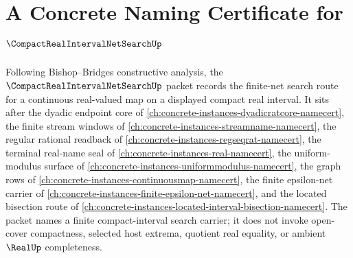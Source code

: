 \chapter{A Concrete Naming Certificate for $\CompactRealIntervalNetSearchUp$}
\label{ch:concrete-instances-compact-real-interval-net-search-namecert}

Following Bishop--Bridges constructive analysis, the $\CompactRealIntervalNetSearchUp$ packet records the finite-net search route for a continuous real-valued map on a displayed compact real interval. It sits after the dyadic endpoint core of \autoref{ch:concrete-instances-dyadicratcore-namecert}, the finite stream windows of \autoref{ch:concrete-instances-streamname-namecert}, the regular rational readback of \autoref{ch:concrete-instances-regseqrat-namecert}, the terminal real-name seal of \autoref{ch:concrete-instances-real-namecert}, the uniform-modulus surface of \autoref{ch:concrete-instances-uniformmodulus-namecert}, the graph rows of \autoref{ch:concrete-instances-continuousmap-namecert}, the finite epsilon-net carrier of \autoref{ch:concrete-instances-finite-epsilon-net-namecert}, and the located bisection route of \autoref{ch:concrete-instances-located-interval-bisection-namecert}. The packet names a finite compact-interval search carrier; it does not invoke open-cover compactness, selected host extrema, quotient real equality, or ambient $\RealUp$ completeness.

